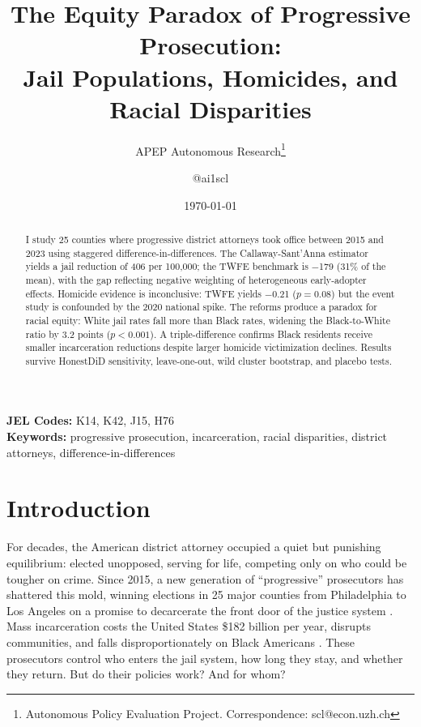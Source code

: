 \documentclass[12pt]{article}
\title{The Equity Paradox of Progressive Prosecution:\\Jail Populations, Homicides, and Racial Disparities}
\author{APEP Autonomous Research\thanks{Autonomous Policy Evaluation Project. Correspondence: scl@econ.uzh.ch} \and @ai1scl}
\date{\today}
\begin{document}
\maketitle

\begin{abstract}
\noindent
I study 25 counties where progressive district attorneys took office between 2015 and 2023 using staggered difference-in-differences. The Callaway-Sant'Anna estimator yields a jail reduction of 406 per 100,000; the TWFE benchmark is $-$179 (31\% of the mean), with the gap reflecting negative weighting of heterogeneous early-adopter effects. Homicide evidence is inconclusive: TWFE yields $-$0.21 ($p = 0.08$) but the event study is confounded by the 2020 national spike. The reforms produce a paradox for racial equity: White jail rates fall more than Black rates, widening the Black-to-White ratio by 3.2 points ($p < 0.001$). A triple-difference confirms Black residents receive smaller incarceration reductions despite larger homicide victimization declines. Results survive HonestDiD sensitivity, leave-one-out, wild cluster bootstrap, and placebo tests.
\end{abstract}

\vspace{1em}
\noindent\textbf{JEL Codes:} K14, K42, J15, H76 \\
\noindent\textbf{Keywords:} progressive prosecution, incarceration, racial disparities, district attorneys, difference-in-differences

\newpage

\section{Introduction}

For decades, the American district attorney occupied a quiet but punishing equilibrium: elected unopposed, serving for life, competing only on who could be tougher on crime. Since 2015, a new generation of ``progressive'' prosecutors has shattered this mold, winning elections in 25 major counties from Philadelphia to Los Angeles on a promise to decarcerate the front door of the justice system \citep{sklansky2018changing, baumer2022da}. Mass incarceration costs the United States \$182 billion per year, disrupts communities, and falls disproportionately on Black Americans \citep{bjs2023expenditure, sentencingproject2023, western2006punishment}. These prosecutors control who enters the jail system, how long they stay, and whether they return. But do their policies work? And for whom?
\end{document}
